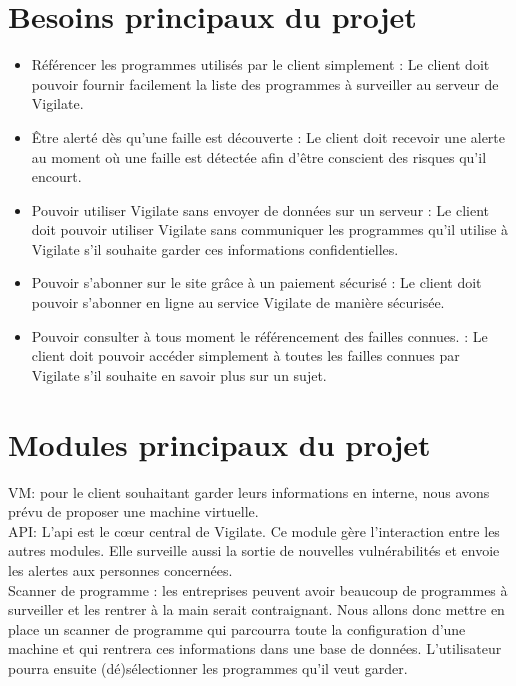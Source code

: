 \section{Besoins principaux du projet}
\begin{itemize}
\item Référencer les programmes utilisés par le client simplement : Le client doit pouvoir fournir facilement la liste des programmes à surveiller au serveur de Vigilate.
\item Être alerté dès qu'une faille est découverte : Le client doit recevoir une alerte au moment où une faille est détectée afin d'être conscient des risques qu'il encourt.
\item Pouvoir utiliser Vigilate sans envoyer de données sur un serveur : Le client doit pouvoir utiliser Vigilate sans communiquer les programmes qu'il utilise à Vigilate s'il souhaite garder ces informations confidentielles.
\item Pouvoir s'abonner sur le site grâce à un paiement sécurisé : Le client doit pouvoir s'abonner en ligne au service Vigilate de manière sécurisée.
\item Pouvoir consulter à tous moment le référencement des failles connues. : Le client doit pouvoir accéder simplement à toutes les failles connues par Vigilate s'il souhaite en savoir plus sur un sujet.
\end{itemize}

\section{Modules principaux du projet}
VM: pour le client souhaitant garder leurs informations en interne, nous avons prévu de proposer une machine virtuelle.\\

API: L'api est le c\oe{}ur central de Vigilate. Ce module gère l'interaction entre les autres modules. Elle surveille aussi la sortie de nouvelles vulnérabilités et envoie les alertes aux personnes concernées.\\

Scanner de programme : les entreprises peuvent avoir beaucoup de programmes à surveiller et les rentrer à la main serait contraignant. Nous allons donc mettre en place un scanner de programme qui parcourra toute la configuration d'une machine et qui rentrera ces informations dans une base de données. L'utilisateur pourra ensuite (dé)sélectionner les programmes qu'il veut garder.\\

